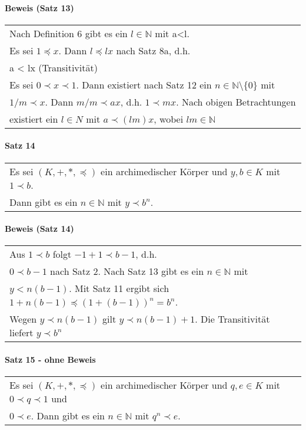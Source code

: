 \documentclass[a4paper]{scrartcl}
\begin{document}
\paragraph{Beweis (Satz 13)}
\begin{tabbing}
\begin{tabular}{l}
Nach Definition 6 gibt es ein $l\in\mathbb{N}$ mit a<l.\\
Es sei $1 \preceq x$. Dann $l\preceq lx$ nach Satz 8a, d.h.\\
a < lx (Transitivität)\\
Es sei $0\prec x\prec 1$. Dann existiert nach Satz 12 ein $n\in\mathbb{N}\setminus\{ 0\}$ mit\\
$1/m \prec x$. Dann $m/m \prec ax$, d.h. $1\prec mx$. Nach obigen Betrachtungen\\
existiert ein $l\in N$ mit $a\prec (lm)x$, wobei $lm\in\mathbb{N}$
\end{tabular}
\end{tabbing}

\paragraph{Satz 14}
\begin{tabbing}
\begin{tabular}{l}
Es sei $(K,+,*,\preceq)$ ein archimedischer Körper und $y,b\in K$ mit $1\prec b$.\\
Dann gibt es ein $n\in\mathbb{N}$ mit $y\prec b^n$.
\end{tabular}
\end{tabbing}

\paragraph{Beweis (Satz 14)}
\begin{tabbing}
\begin{tabular}{l}
Aus $1\prec b$ folgt $-1+1\prec b-1$, d.h.\\
$0\prec b-1$ nach Satz 2. Nach Satz 13 gibt es ein $n\in\mathbb{N}$ mit\\
$y<n(b-1)$. Mit Satz 11 ergibt sich $1+n(b-1)\preceq (1+(b-1))^n = b^n$.\\
Wegen $y\prec n(b-1)$ gilt $y\prec n(b-1)+1$. Die Transitivität liefert $y\prec b^n$
\end{tabular}
\end{tabbing}

\paragraph{Satz 15 - ohne Beweis}
\begin{tabbing}
\begin{tabular}{l}
Es sei $(K,+,*,\preceq)$ ein archimedischer Körper und $q,e\in K$ mit $0\prec q \prec 1$ und\\
$0\prec e$. Dann gibt es ein $n\in\mathbb{N}$ mit $q^n\prec e$.
\end{tabular}
\end{tabbing}
\end{document}
